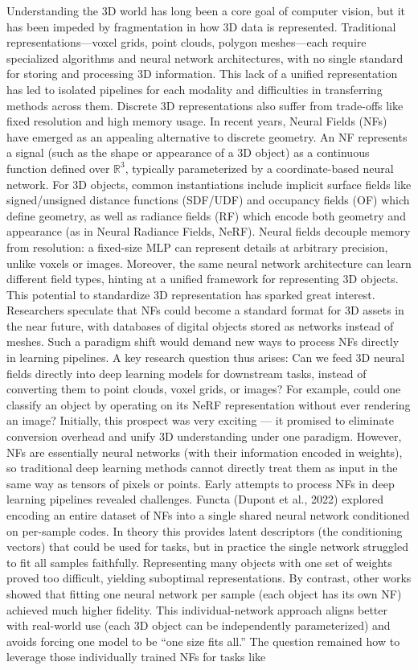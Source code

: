 \documentclass[11pt]{article}
\begin{document}
Understanding the 3D world has long been a core goal of computer vision, but it has been impeded by fragmentation in how 3D data is represented. Traditional representations—voxel grids, point clouds, polygon meshes—each require specialized algorithms and neural network architectures, with no single standard for storing and processing 3D information. This lack of a unified representation has led to isolated pipelines for each modality and difficulties in transferring methods across them. Discrete 3D representations also suffer from trade-offs like fixed resolution and high memory usage. In recent years, Neural Fields (NFs) have emerged as an appealing alternative to discrete geometry. An NF represents a signal (such as the shape or appearance of a 3D object) as a continuous function defined over $\mathbb{R}^3$, typically parameterized by a coordinate-based neural network. For 3D objects, common instantiations include implicit surface fields like signed/unsigned distance functions (SDF/UDF) and occupancy fields (OF) which define geometry, as well as radiance fields (RF) which encode both geometry and appearance (as in Neural Radiance Fields, NeRF). Neural fields decouple memory from resolution: a fixed-size MLP can represent details at arbitrary precision, unlike voxels or images. Moreover, the same neural network architecture can learn different field types, hinting at a unified framework for representing 3D objects. This potential to standardize 3D representation has sparked great interest. Researchers speculate that NFs could become a standard format for 3D assets in the near future, with databases of digital objects stored as networks instead of meshes. Such a paradigm shift would demand new ways to process NFs directly in learning pipelines. A key research question thus arises: Can we feed 3D neural fields directly into deep learning models for downstream tasks, instead of converting them to point clouds, voxel grids, or images? For example, could one classify an object by operating on its NeRF representation without ever rendering an image? Initially, this prospect was very exciting — it promised to eliminate conversion overhead and unify 3D understanding under one paradigm. However, NFs are essentially neural networks (with their information encoded in weights), so traditional deep learning methods cannot directly treat them as input in the same way as tensors of pixels or points. Early attempts to process NFs in deep learning pipelines revealed challenges. Functa (Dupont et al., 2022) explored encoding an entire dataset of NFs into a single shared neural network conditioned on per-sample codes. In theory this provides latent descriptors (the conditioning vectors) that could be used for tasks, but in practice the single network struggled to fit all samples faithfully. Representing many objects with one set of weights proved too difficult, yielding suboptimal representations. By contrast, other works showed that fitting one neural network per sample (each object has its own NF) achieved much higher fidelity. This individual-network approach aligns better with real-world use (each 3D object can be independently parameterized) and avoids forcing one model to be “one size fits all.” The question remained how to leverage those individually trained NFs for tasks like 
\end{document}
